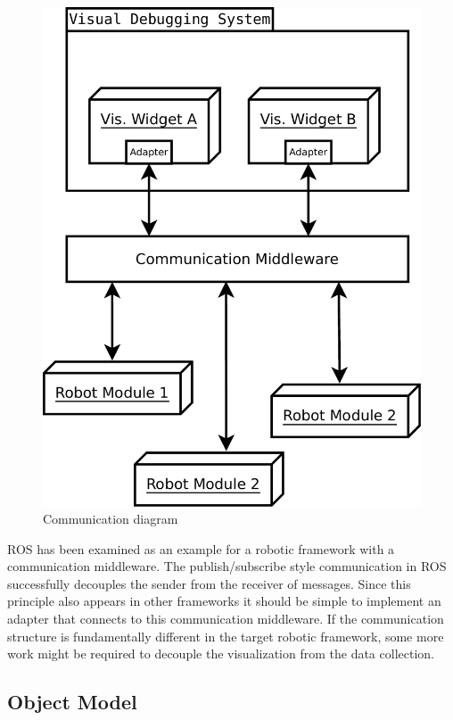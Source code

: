 \begin{figure}%
  \centering
  \includegraphics[width=.7\textwidth]{diagrams/communication_diagram}
  \caption{Communication diagram}
  \label{communication_diagram}
\end{figure}

\q
ROS has been examined as an example for a robotic framework with a communication middleware. The publish/subscribe style communication in ROS successfully decouples the sender from the receiver of messages. Since this principle also appears in other frameworks it should be simple to implement an adapter that connects to this communication middleware. If the communication structure is fundamentally different in the target robotic framework, some more work might be required to decouple the visualization from the data collection.

\q

\subsection{Object Model}
\label{object_model_section}

